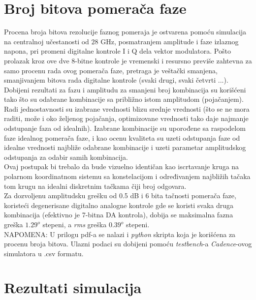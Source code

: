 \documentclass[journal,twocolumn,letterpaper]{IEEEJERM}
\begin{document}
\section{Broj bitova pomerača faze}

Procena broja bitova rezolucije faznog pomeraja je ostvarena pomoću simulacija na centralnoj učestanosti od $28$ GHz, posmatranjem amplitude i faze izlaznog napona, pri promeni digitalne kontrole I i Q dela vektor modulatora. Pošto prolazak kroz ove dve 8-bitne kontrole je vremenski i resursno previše zahtevna za samo procenu rada ovog pomerača faze, pretraga je veštački smanjena, smanjivanjem bitova rada digitalne kontrole (svaki drugi, svaki četvrti ...). Dobijeni rezultati za fazu i amplitudu  za smanjeni broj kombinacija su korišćeni tako što su odabrane kombinacije sa približno istom amplitudom (pojačanjem). Radi jednostavnosti su izabrane vrednosti blizu srednje vrednosti (što se ne mora raditi, može i oko željenog pojačanja, optimizovane vrednosti tako daje najmanje odstupanje faza od idealnih). Izabrane kombinacije su uporođene sa raspodelom faze idealnog pomerača faze, i kao ocenu kvaliteta su uzeti odstupanja faze od idealne vrednosti najbliže odabrane kombinacije i uzeti parametar amplitudskog odstupanja za odabir samih kombinacija. \\

Ovaj postupak bi trebalo da bude vizuelno identičan kao iscrtavanje kruga na polarnom koordinatnom sistemu sa konstelacijom i određivanjem najbližih tačaka tom krugu na idealni diskretnim tačkama čiji broj odgovara. \\

Za dozvoljenu amplitudsku grešku od 0.5 dB i 6 bita tačnosti pomerača faze, koristeći degenerisane digitalno analogne kontrole gde se koristi svaka druga kombinacija (efektivno je 7-bitna DA kontrola), dobija se maksimalna fazna greška $1.29^o$ stepeni, a \textit{rms} greška $0.39^o$ stepeni.  \\

NAPOMENA: U prilogu pdf-a se nalazi i \textit{python} skripta koja je korišćena za procenu broja bitova. Ulazni podaci su dobijeni pomoću \textit{testbench}-a \textit{Cadence}-ovog simulatora u .csv formatu.

\section{Rezultati simulacija}
\end{document}
